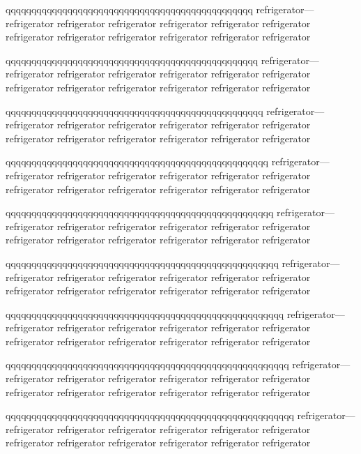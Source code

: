 \documentclass{article}
\def\endash{--}
\def\emdash{\endash-}
\begin{document}
\fbox{\parbox{3.8cm}{%
refrigerator\emdash refrigerator\emdash refrigerator
}}

\noindent qqqqqqqqqqqqqqqqqqqqqqqqqqqqqqqqqqqqqqqqqqqqqqqq refrigerator\emdash refrigerator refrigerator refrigerator refrigerator refrigerator refrigerator refrigerator refrigerator refrigerator refrigerator refrigerator refrigerator

\noindent qqqqqqqqqqqqqqqqqqqqqqqqqqqqqqqqqqqqqqqqqqqqqqqqq refrigerator---refrigerator refrigerator refrigerator refrigerator refrigerator refrigerator refrigerator refrigerator refrigerator refrigerator refrigerator refrigerator

\noindent qqqqqqqqqqqqqqqqqqqqqqqqqqqqqqqqqqqqqqqqqqqqqqqqqq refrigerator---refrigerator refrigerator refrigerator refrigerator refrigerator refrigerator refrigerator refrigerator refrigerator refrigerator refrigerator refrigerator

\noindent qqqqqqqqqqqqqqqqqqqqqqqqqqqqqqqqqqqqqqqqqqqqqqqqqqq refrigerator---refrigerator refrigerator refrigerator refrigerator refrigerator refrigerator refrigerator refrigerator refrigerator refrigerator refrigerator refrigerator

\noindent qqqqqqqqqqqqqqqqqqqqqqqqqqqqqqqqqqqqqqqqqqqqqqqqqqqq refrigerator---refrigerator refrigerator refrigerator refrigerator refrigerator refrigerator refrigerator refrigerator refrigerator refrigerator refrigerator refrigerator

\noindent qqqqqqqqqqqqqqqqqqqqqqqqqqqqqqqqqqqqqqqqqqqqqqqqqqqqq refrigerator---refrigerator refrigerator refrigerator refrigerator refrigerator refrigerator refrigerator refrigerator refrigerator refrigerator refrigerator refrigerator

\noindent qqqqqqqqqqqqqqqqqqqqqqqqqqqqqqqqqqqqqqqqqqqqqqqqqqqqqq refrigerator---refrigerator refrigerator refrigerator refrigerator refrigerator refrigerator refrigerator refrigerator refrigerator refrigerator refrigerator refrigerator

\noindent qqqqqqqqqqqqqqqqqqqqqqqqqqqqqqqqqqqqqqqqqqqqqqqqqqqqqqq refrigerator---refrigerator refrigerator refrigerator refrigerator refrigerator refrigerator refrigerator refrigerator refrigerator refrigerator refrigerator refrigerator

\noindent qqqqqqqqqqqqqqqqqqqqqqqqqqqqqqqqqqqqqqqqqqqqqqqqqqqqqqqq refrigerator---refrigerator refrigerator refrigerator refrigerator refrigerator refrigerator refrigerator refrigerator refrigerator refrigerator refrigerator refrigerator
\end{document}
